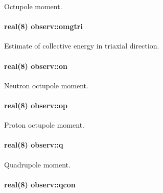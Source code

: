 Octupole moment. 

\paragraph[{\texorpdfstring{omgtri}{omgtri}}]{\setlength{\rightskip}{0pt plus 5cm}real(8) observ\+::omgtri}\hypertarget{namespaceobserv_a173bfde5e0842795adefaf2aec38fb68}{}\label{namespaceobserv_a173bfde5e0842795adefaf2aec38fb68}


Estimate of collective energy in triaxial direction. 

\paragraph[{\texorpdfstring{on}{on}}]{\setlength{\rightskip}{0pt plus 5cm}real(8) observ\+::on}\hypertarget{namespaceobserv_afd9ef4eafea719e983a484a385cf56b7}{}\label{namespaceobserv_afd9ef4eafea719e983a484a385cf56b7}


Neutron octupole moment. 

\paragraph[{\texorpdfstring{op}{op}}]{\setlength{\rightskip}{0pt plus 5cm}real(8) observ\+::op}\hypertarget{namespaceobserv_ac7b149276ccf05582c5270bafacab20b}{}\label{namespaceobserv_ac7b149276ccf05582c5270bafacab20b}


Proton octupole moment. 

\paragraph[{\texorpdfstring{q}{q}}]{\setlength{\rightskip}{0pt plus 5cm}real(8) observ\+::q}\hypertarget{namespaceobserv_af34b6ff143a2dfdf6559141d5d23fbea}{}\label{namespaceobserv_af34b6ff143a2dfdf6559141d5d23fbea}


Quadrupole moment. 

\paragraph[{\texorpdfstring{qcon}{qcon}}]{\setlength{\rightskip}{0pt plus 5cm}real(8) observ\+::qcon}\hypertarget{namespaceobserv_a2b56c807c1301829c79e6f061ac78297}{}\label{namespaceobserv_a2b56c807c1301829c79e6f061ac78297}


